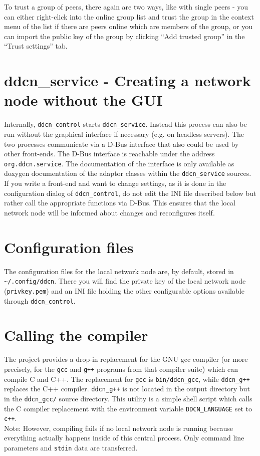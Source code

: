 \documentclass[a4paper,9pt]{scrartcl}
\begin{document}
To trust a group of peers, there again are two ways, like with single peers - you can either right-click into the online group list and trust the group in the context menu of the list if there are peers online which are members of the group, or you can import the public key of the group by clicking ``Add trusted group'' in the ``Trust settings'' tab.

\section{ddcn\_service - Creating a network node without the GUI}

Internally, \texttt{ddcn\_control} starts \texttt{ddcn\_service}. Instead this process can also be run without the graphical interface if necessary (e.g. on headless servers). The two processes communicate via a D-Bus interface that also could be used by other front-ends. The D-Bus interface is reachable under the address \texttt{org.ddcn.service}. The documentation of the interface is only available as doxygen documentation of the adaptor classes within the \texttt{ddcn\_service} sources. If you write a front-end and want to change settings, as it is done in the configuration dialog of \texttt{ddcn\_control}, do not edit the INI file described below but rather call the appropriate functions via D-Bus. This ensures that the local network node will be informed about changes and reconfigures itself.

\section{Configuration files}

The configuration files for the local network node are, by default, stored in \texttt{\textasciitilde/.config/ddcn}. There you will find the private key of the local network node (\texttt{privkey.pem}) and an INI file holding the other configurable options available through \texttt{ddcn\_control}.

\section{Calling the compiler}

The project provides a drop-in replacement for the GNU gcc compiler (or more precisely, for the \texttt{gcc} and \texttt{g++} programs from that compiler suite) which can compile C and C++. The replacement for \texttt{gcc} is \texttt{bin/ddcn\_gcc}, while \texttt{ddcn\_g++} replaces the C++ compiler. \texttt{ddcn\_g++} is not located in the output directory but in the \texttt{ddcn\_gcc/} source directory. This utility is a simple shell script which calls the C compiler replacement with the environment variable \texttt{DDCN\_LANGUAGE} set to \texttt{c++}.\\
Note: However, compiling fails if no local network node is running because everything actually happens inside of this central process. Only command line parameters and \texttt{stdin} data are transferred.\\
\smallskip
\end{document}
